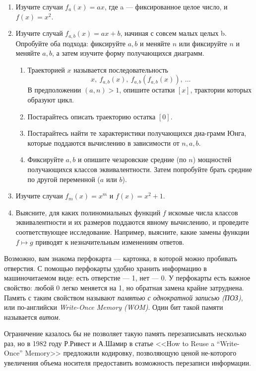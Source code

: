 \begin{enumerate}
\item Изучите случаи $f_a(x)=ax$, где a --- фиксированное целое число, и $f(x)=x^2$.
\item Изучите случай $f_{a, b}(x) = ax+b$, начиная с совсем малых целых b. Опробуйте оба подхода: фиксируйте $a,b$ и меняйте $n$ или фиксируйте $n$ и меняйте $a,b$, а затем изучите форму получающихся диаграмм.
\begin{enumerate}
\item Траекторией $x$ называется последовательность
	$$x,\ f_{a,b}(x),\ f_{a,b}(f_{a,b}(x)),\ \ldots$$
В предположении $(a,n) > 1$, опишите остатки $[x]$, трактории которых образуют цикл.
\item Постарайтесь описать траекторию остатка $[0]$.
\item Постарайтесь найти те характеристики получающихся диа-\linebreak грамм Юнга, которые поддаются вычислению в зависимости от $n,a,b$.
\item Фиксируйте $a,b$ и опишите чезаровские средние (по $n$) мощностей получающихся классов эквивалентности. Затем попробуйте брать средние по другой переменной ($a$ или $b$).
\end{enumerate}
\item Изучите случаи $f_m(x) = x^m$ и $f(x) = x^2+1$.
\item Выясните, для каких полиномиальных функций $f$ искомые числа классов эквивалентности и их размеров поддаются явному вычислению, и проведите соответствующее исследование. Например, выясните, какие замены функции $f \mapsto g$ приводят к незначительным изменениям ответов.
\end{enumerate}

\bigskip


\medskip

Возможно, вам знакома перфокарта --- картонка, в которой можно пробивать отверстия. С помощью перфокарты удобно хранить информацию в машиночитаемом виде: есть отверстие --- 1, нет --- 0. У перфокарты есть важное свойство: любой 0 легко меняется на 1, но обратная замена крайне затруднена. Память с таким свойством называют \emph{памятью с однократной записью (ПОЗ)}, или по-английски \emph{Write-Once Memory (WOM)}. Один бит такой памяти называется \emph{витом}.

Ограничение казалось бы не позволяет такую память перезаписывать несколько
раз, но в 1982 году Р.Ривест и А.Шамир в статье <<How to Reuse a ``Write-Once'' Memory>> предложили кодировку, позволяющую ценой не-\linebreak которого увеличения объема носителя предоставить возможность перезаписи информации.
                                                     
